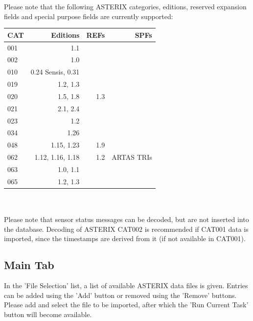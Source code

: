 Please note that the following ASTERIX categories, editions, reserved expansion fields and special purpose fields are currently supported: \\

\begin{tabular}{ | l | r | r | r |}
\hline
  CAT & Editions & REFs & SPFs  \\ \hline
  001 & 1.1 &  &  \\ \hline
  002 & 1.0 &  &  \\ \hline
  010 & 0.24 Sensis, 0.31  &  &  \\ \hline
  019 & 1.2, 1.3 & & \\ \hline
  020 & 1.5, 1.8 & 1.3 & \\ \hline
  021 & 2.1, 2.4 & & \\ \hline
  023 & 1.2 & & \\ \hline
  034 & 1.26 & & \\ \hline
  048 & 1.15, 1.23 & 1.9 & \\ \hline
  062 & 1.12, 1.16, 1.18 & 1.2 & ARTAS TRIs \\ \hline
  063 & 1.0, 1.1 & & \\ \hline
  065 & 1.2, 1.3 & & \\ \hline
\end{tabular} \\
\  \\

Please note that sensor status messages can be decoded, but are not inserted into the database. Decoding of ASTERIX CAT002 is recommended if CAT001 data is imported, since the timestamps are derived from it (if not available in CAT001).

\subsection{Main Tab}

In the 'File Selection' list, a list of available ASTERIX data files is given. Entries can be added using the 'Add' button or removed using the 'Remove' buttons. \\

Please add and select the file to be imported, after which the 'Run Current Task' button will become available. \\

